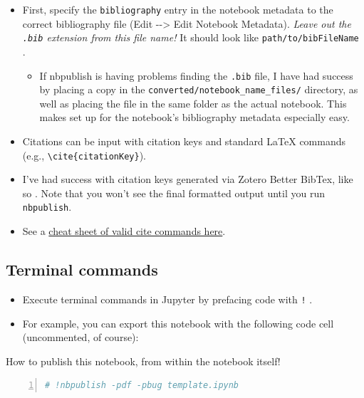 \documentclass[10pt,parskip=half,
	toc=sectionentrywithdots,
	bibliography=totocnumbered,
	captions=tableheading,
    numbers=noendperiod,
    headings=standardclasses]{scrartcl}
\providecommand{\tightlist}{%
  \setlength{\itemsep}{0pt}\setlength{\parskip}{0pt}}
\begin{document}
\begin{itemize}
\tightlist
\item
  First, specify the \texttt{bibliography} entry in the notebook
  metadata to the correct bibliography file (Edit -\/-\textgreater{}
  Edit Notebook Metadata). \emph{Leave out the \texttt{.bib} extension
  from this file name!} It should look like \texttt{path/to/bibFileName}
  .

  \begin{itemize}
  \tightlist
  \item
    If nbpublish is having problems finding the \texttt{.bib} file, I
    have had success by placing a copy in the
    \texttt{converted/notebook\_name\_files/} directory, as well as
    placing the file in the same folder as the actual notebook. This
    makes set up for the notebook's bibliography metadata especially
    easy.
  \end{itemize}
\item
  Citations can be input with citation keys and standard
  \LaTeX \hphantom{} commands (e.g.,
  \texttt{\textbackslash{}cite\{citationKey\}}).
\item
  I've had success with citation keys generated via Zotero Better
  BibTex, like so \citep{uddenbergTelefaceSerialReproduction2018}. Note
  that you won't see the final formatted output until you run
  \texttt{nbpublish}.
\item
  See a \href{http://merkel.texture.rocks/Latex/natbib.php}{cheat sheet
  of valid cite commands here}.
\end{itemize}

\subsection{Terminal commands}\label{terminal-commands}

\begin{itemize}
\tightlist
\item
  Execute terminal commands in Jupyter by prefacing code with \texttt{!}
  .
\item
  For example, you can export this notebook with the following code cell
  (uncommented, of course):
\end{itemize}

\begin{codecell}[H]

    \caption{How to publish this notebook, from within the notebook itself!}\label{code:publish}\begin{lstlisting}[language=Python,numbers=left,xleftmargin=20pt,xrightmargin=5pt,belowskip=5pt,aboveskip=5pt]
# !nbpublish -pdf -pbug template.ipynb
\end{lstlisting}\end{codecell}
\end{document}
